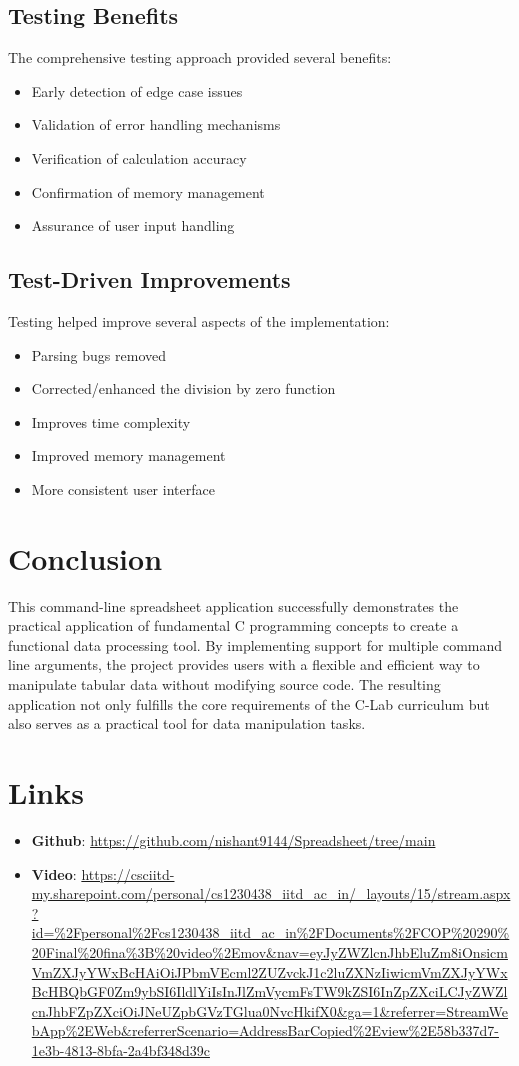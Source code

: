 \documentclass{article}
\begin{document}
\subsection{Testing Benefits}
The comprehensive testing approach provided several benefits:
\begin{itemize}
    \item Early detection of edge case issues
    \item Validation of error handling mechanisms
    \item Verification of calculation accuracy
    \item Confirmation of memory management
    \item Assurance of user input handling
\end{itemize}

\subsection{Test-Driven Improvements}
Testing helped improve several aspects of the implementation:
\begin{itemize}
    \item Parsing bugs removed
    \item Corrected/enhanced the division by zero function
    \item Improves time complexity 
    \item Improved memory management
    \item More consistent user interface
\end{itemize}


\section{Conclusion}
This command-line spreadsheet application successfully demonstrates the practical application of fundamental C programming concepts to create a functional data processing tool.
By implementing support for multiple command line arguments, the project provides users
with a flexible and efficient way to manipulate tabular data without modifying source code.
The resulting application not only fulfills the core requirements of the C-Lab curriculum but
also serves as a practical tool for data manipulation tasks.

\section{Links}
\begin{itemize}
    \item \textbf{Github}: \url{https://github.com/nishant9144/Spreadsheet/tree/main}
    \item \textbf{Video}: \url{https://csciitd-my.sharepoint.com/personal/cs1230438_iitd_ac_in/_layouts/15/stream.aspx?id=%2Fpersonal%2Fcs1230438_iitd_ac_in%2FDocuments%2FCOP%20290%20Final%20fina%3B%20video%2Emov&nav=eyJyZWZlcnJhbEluZm8iOnsicmVmZXJyYWxBcHAiOiJPbmVEcml2ZUZvckJ1c2luZXNzIiwicmVmZXJyYWxBcHBQbGF0Zm9ybSI6IldlYiIsInJlZmVycmFsTW9kZSI6InZpZXciLCJyZWZlcnJhbFZpZXciOiJNeUZpbGVzTGlua0NvcHkifX0&ga=1&referrer=StreamWebApp%2EWeb&referrerScenario=AddressBarCopied%2Eview%2E58b337d7-1e3b-4813-8bfa-2a4bf348d39c}
\end{itemize}
\end{document}
